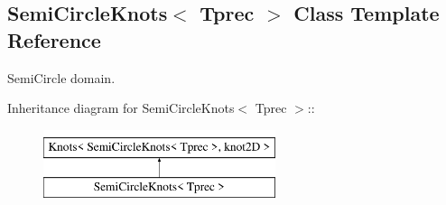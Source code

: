 \hypertarget{classSemiCircleKnots}{
\subsection{SemiCircleKnots$<$ Tprec $>$ Class Template Reference}
\label{classSemiCircleKnots}
}
SemiCircle domain.  


Inheritance diagram for SemiCircleKnots$<$ Tprec $>$::\begin{figure}[H]
\begin{center}
\leavevmode
\includegraphics[height=2cm]{classSemiCircleKnots}
\end{center}
\end{figure}
